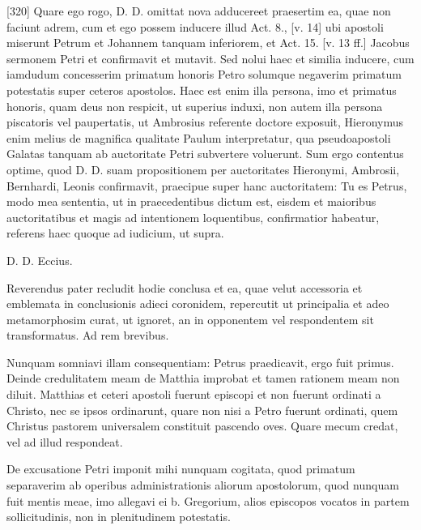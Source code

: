 [320] Quare ego rogo, D. D. omittat nova adducereet praesertim ea, quae non faciunt adrem, cum et ego possem inducere illud Act. 8., [v. 14] ubi apostoli miserunt Petrum et Johannem tanquam inferiorem, et Act. 15. [v. 13 ff.] Jacobus sermonem Petri et confirmavit et mutavit. Sed nolui haec et similia inducere, cum iamdudum concesserim primatum honoris Petro solumque negaverim primatum potestatis super ceteros apostolos. Haec est enim illa persona, imo et primatus honoris, quam deus non respicit, ut superius induxi, non autem illa persona piscatoris vel paupertatis, ut Ambrosius referente doctore exposuit, Hieronymus enim melius de magnifica qualitate Paulum interpretatur, qua pseudoapostoli Galatas tanquam ab auctoritate Petri subvertere voluerunt. Sum ergo contentus optime, quod D. D. suam propositionem per auctoritates Hieronymi, Ambrosii, Bernhardi, Leonis confirmavit, praecipue super hanc auctoritatem: Tu es Petrus, modo mea sententia, ut in praecedentibus dictum est, eisdem et maioribus auctoritatibus et magis ad intentionem loquentibus, confirmatior habeatur, referens haec quoque ad iudicium, ut supra.

D. D. Eccius.

Reverendus pater recludit hodie conclusa et ea, quae velut accessoria et emblemata in conclusionis adieci coronidem, repercutit ut principalia et adeo metamorphosim curat, ut ignoret, an in opponentem vel respondentem sit transformatus. Ad rem brevibus.

Nunquam somniavi illam consequentiam: Petrus praedicavit, ergo fuit primus. Deinde credulitatem meam de Matthia improbat et tamen rationem meam non diluit. Matthias et ceteri apostoli fuerunt episcopi et non fuerunt ordinati a Christo, nec se ipsos ordinarunt, quare non nisi a Petro fuerunt ordinati, quem Christus pastorem universalem constituit pascendo oves. Quare mecum credat, vel ad illud respondeat.

De excusatione Petri imponit mihi nunquam cogitata, quod primatum separaverim ab operibus administrationis aliorum apostolorum, quod nunquam fuit mentis meae, imo allegavi ei b. Gregorium, alios episcopos vocatos in partem sollicitudinis, non in plenitudinem potestatis.

